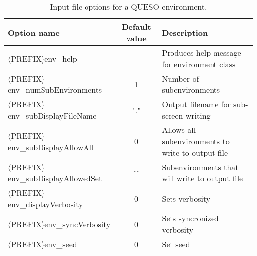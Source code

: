 \begin{table}[htpb]
\begin{center}
\caption{Input file options for a QUESO environment.}\label{tab-env-options}
\begin{tabular}{l c  m{6cm}}
\toprule
Option name                      &  Default  value & Description \\
\midrule\midrule
\ttfamily $\langle$PREFIX$\rangle$env\_help                &     & Produces help message for environment class            \\
\ttfamily$\langle$PREFIX$\rangle$env\_numSubEnvironments   &  1  &  Number of subenvironments                \\ %
\ttfamily$\langle$PREFIX$\rangle$env\_subDisplayFileName   & \ttfamily"." & Output filename for sub-screen writing     \\ %
\ttfamily$\langle$PREFIX$\rangle$env\_subDisplayAllowAll   &  0  & Allows all subenvironments to write to output file \\ %
\ttfamily$\langle$PREFIX$\rangle$env\_subDisplayAllowedSet & \ttfamily""  & Subenvironments that will write to output file \\ %
\ttfamily$\langle$PREFIX$\rangle$env\_displayVerbosity     &  0  & Sets verbosity				         \\ %
\ttfamily$\langle$PREFIX$\rangle$env\_syncVerbosity        &  0  & Sets syncronized verbosity             \\ %
\ttfamily$\langle$PREFIX$\rangle$env\_seed                 &  0  & Set seed                              \\ %
%
\bottomrule
\end{tabular}
\end{center}
\end{table}

